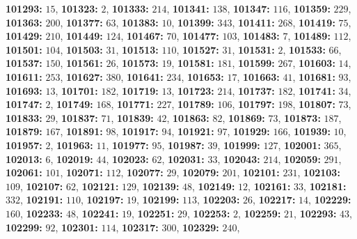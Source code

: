 \textsf{\bfseries 101293:} $15$, \textsf{\bfseries 101323:} $2$, \textsf{\bfseries 101333:} $214$, \textsf{\bfseries 101341:} $138$, \textsf{\bfseries 101347:} $116$, \textsf{\bfseries 101359:} $229$, \textsf{\bfseries 101363:} $200$, \textsf{\bfseries 101377:} $63$, \textsf{\bfseries 101383:} $10$, \textsf{\bfseries 101399:} $343$, \textsf{\bfseries 101411:} $268$, \textsf{\bfseries 101419:} $75$, \textsf{\bfseries 101429:} $210$, \textsf{\bfseries 101449:} $124$, \textsf{\bfseries 101467:} $70$, \textsf{\bfseries 101477:} $103$, \textsf{\bfseries 101483:} $7$, \textsf{\bfseries 101489:} $112$, \textsf{\bfseries 101501:} $104$, \textsf{\bfseries 101503:} $31$, \textsf{\bfseries 101513:} $110$, \textsf{\bfseries 101527:} $31$, \textsf{\bfseries 101531:} $2$, \textsf{\bfseries 101533:} $66$, \textsf{\bfseries 101537:} $150$, \textsf{\bfseries 101561:} $26$, \textsf{\bfseries 101573:} $19$, \textsf{\bfseries 101581:} $181$, \textsf{\bfseries 101599:} $267$, \textsf{\bfseries 101603:} $14$, \textsf{\bfseries 101611:} $253$, \textsf{\bfseries 101627:} $380$, \textsf{\bfseries 101641:} $234$, \textsf{\bfseries 101653:} $17$, \textsf{\bfseries 101663:} $41$, \textsf{\bfseries 101681:} $93$, \textsf{\bfseries 101693:} $13$, \textsf{\bfseries 101701:} $182$, \textsf{\bfseries 101719:} $13$, \textsf{\bfseries 101723:} $214$, \textsf{\bfseries 101737:} $182$, \textsf{\bfseries 101741:} $34$, \textsf{\bfseries 101747:} $2$, \textsf{\bfseries 101749:} $168$, \textsf{\bfseries 101771:} $227$, \textsf{\bfseries 101789:} $106$, \textsf{\bfseries 101797:} $198$, \textsf{\bfseries 101807:} $73$, \textsf{\bfseries 101833:} $29$, \textsf{\bfseries 101837:} $71$, \textsf{\bfseries 101839:} $42$, \textsf{\bfseries 101863:} $82$, \textsf{\bfseries 101869:} $73$, \textsf{\bfseries 101873:} $187$, \textsf{\bfseries 101879:} $167$, \textsf{\bfseries 101891:} $98$, \textsf{\bfseries 101917:} $94$, \textsf{\bfseries 101921:} $97$, \textsf{\bfseries 101929:} $166$, \textsf{\bfseries 101939:} $10$, \textsf{\bfseries 101957:} $2$, \textsf{\bfseries 101963:} $11$, \textsf{\bfseries 101977:} $95$, \textsf{\bfseries 101987:} $39$, \textsf{\bfseries 101999:} $127$, \textsf{\bfseries 102001:} $365$, \textsf{\bfseries 102013:} $6$, \textsf{\bfseries 102019:} $44$, \textsf{\bfseries 102023:} $62$, \textsf{\bfseries 102031:} $33$, \textsf{\bfseries 102043:} $214$, \textsf{\bfseries 102059:} $291$, \textsf{\bfseries 102061:} $101$, \textsf{\bfseries 102071:} $112$, \textsf{\bfseries 102077:} $29$, \textsf{\bfseries 102079:} $201$, \textsf{\bfseries 102101:} $231$, \textsf{\bfseries 102103:} $109$, \textsf{\bfseries 102107:} $62$, \textsf{\bfseries 102121:} $129$, \textsf{\bfseries 102139:} $48$, \textsf{\bfseries 102149:} $12$, \textsf{\bfseries 102161:} $33$, \textsf{\bfseries 102181:} $332$, \textsf{\bfseries 102191:} $110$, \textsf{\bfseries 102197:} $19$, \textsf{\bfseries 102199:} $113$, \textsf{\bfseries 102203:} $26$, \textsf{\bfseries 102217:} $14$, \textsf{\bfseries 102229:} $160$, \textsf{\bfseries 102233:} $48$, \textsf{\bfseries 102241:} $19$, \textsf{\bfseries 102251:} $29$, \textsf{\bfseries 102253:} $2$, \textsf{\bfseries 102259:} $21$, \textsf{\bfseries 102293:} $43$, \textsf{\bfseries 102299:} $92$, \textsf{\bfseries 102301:} $114$, \textsf{\bfseries 102317:} $300$, \textsf{\bfseries 102329:} $240$, 
